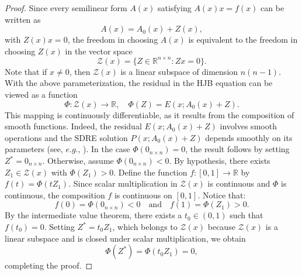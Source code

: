 \documentclass{article}
\begin{document}
\begin{proof}
    Since every semilinear form $A(x)$ satisfying $A(x)x=f(x)$ can be written as
   \[
   A(x)=A_0(x)+Z(x),
   \]
   with $Z(x)x=0$, the freedom in choosing $A(x)$ is equivalent to the freedom in choosing $Z(x)$ in the vector space
   \[
   \mathcal{Z}(x)=\{Z\in\mathbb{R}^{n\times n}: Zx=0\}.
   \]
   Note that if $x\neq 0$, then $\mathcal{Z}(x)$ is a linear subspace of dimension $n(n-1)$. With the above parameterization, the residual in the HJB equation can be viewed as a function
   \[
   \Phi:\mathcal{Z}(x)\to\mathbb{R},\quad \Phi(Z)=E(x;A_0(x)+Z).
   \]
  This mapping is continuously differentiable, as it results from the composition of smooth functions. Indeed, the residual $E(x;A_0(x)+Z)$ involves smooth operations and the SDRE solution $P(x;A_0(x)+Z)$ depends smoothly on its parameters (see, $e.g.$, \cite{ran1988parameter,sontag2013mathematical}).
  In the case $\Phi(0_{n \times n})=0$, the result follows by setting $Z^*=0_{n \times n}$. Otherwise, assume \(\Phi(0_{n \times n}) < 0\). By hypothesis, there exists \( Z_1 \in \mathcal{Z}(x) \) with \(\Phi(Z_1) > 0\).  
   Define the function \( f : [0,1] \to \mathbb{R} \) by
   $ 
   f(t) = \Phi(t Z_1).
   $
   Since scalar multiplication in $\mathcal{Z}(x)$ is continuous and \(\Phi\) is continuous, the composition \(f\) is continuous on \([0,1]\).  
   Notice that:
   \[
   f(0) = \Phi(0_{n \times n}) < 0 \quad \text{and} \quad f(1) = \Phi(Z_1) > 0.
   \]
   By the intermediate value theorem, there exists a \( t_0 \in (0,1) \) such that
   $
   f(t_0) = 0.
   $
   Setting \( Z^* = t_0 Z_1 \), which belongs to \(\mathcal{Z}(x)\) because \(\mathcal{Z}(x)\) is a linear subspace and is closed under scalar multiplication, we obtain
   \[
   \Phi(Z^*) = \Phi(t_0 Z_1) = 0,
   \]
   completing the proof.
    
   \end{proof}

    
\end{document}
